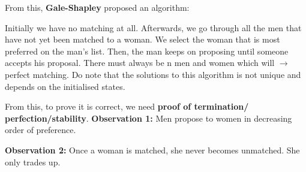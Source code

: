 \documentclass[11pt, oneside]{article}
\theoremstyle{definition}
\begin{document}
From this, \textbf{Gale-Shapley} proposed an algorithm:


Initially we have no matching at all. Afterwards, we go through all the men that have not yet been matched to a woman. We select the woman that is most preferred on the man's list. Then, the man keeps on proposing until someone accepts his proposal. There must always be n men and women which will $\rightarrow$ perfect matching. Do note that the solutions to this algorithm is not unique and depends on the initialised states.

From this, to prove it is correct, we need \textbf{proof of termination/ perfection/stability}.
\textbf{Observation 1:} Men propose to women in decreasing order of preference.

\textbf{Observation 2:} Once a woman is matched, she never becomes unmatched. She only trades up.
\end{document}
